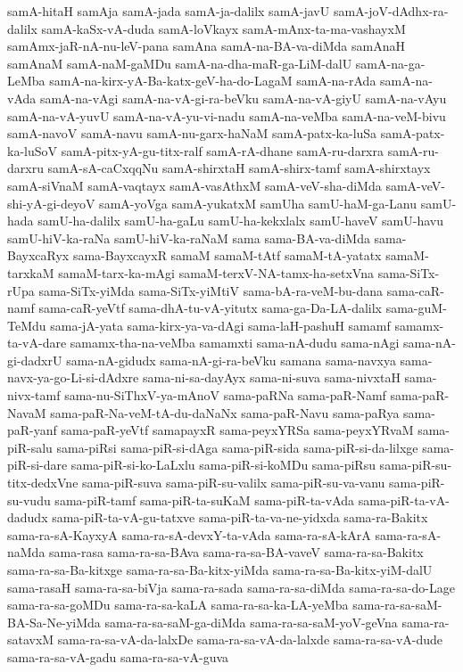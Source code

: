 {samA-hitaH
samAja
samA-jada
samA-ja-dalilx
samA-javU
samA-joV-dAdhx-ra-dalilx
samA-kaSx-vA-duda
samA-loVkayx
samA-mAnx-ta-ma-vashayxM
samAmx-jaR-nA-nu-leV-pana
samAna
samA-na-BA-va-diMda
samAnaH
samAnaM
samA-naM-gaMDu
samA-na-dha-maR-ga-LiM-dalU
samA-na-ga-LeMba
samA-na-kirx-yA-Ba-katx-geV-ha-do-LagaM
samA-na-rAda
samA-na-vAda
samA-na-vAgi
samA-na-vA-gi-ra-beVku
samA-na-vA-giyU
samA-na-vAyu
samA-na-vA-yuvU
samA-na-vA-yu-vi-nadu
samA-na-veMba
samA-na-veM-bivu
samA-navoV
samA-navu
samA-nu-garx-haNaM
samA-patx-ka-luSa
samA-patx-ka-luSoV
samA-pitx-yA-gu-titx-ralf
samA-rA-dhane
samA-ru-darxra
samA-ru-darxru
samA-sA-caCxqqNu
samA-shirxtaH
samA-shirx-tamf
samA-shirxtayx
samA-siVnaM
samA-vaqtayx
samA-vasAthxM
samA-veV-sha-diMda
samA-veV-shi-yA-gi-deyoV
samA-yoVga
samA-yukatxM
samUha
samU-haM-ga-Lanu
samU-hada
samU-ha-dalilx
samU-ha-gaLu
samU-ha-kekxlalx
samU-haveV
samU-havu
samU-hiV-ka-raNa
samU-hiV-ka-raNaM
sama
sama-BA-va-diMda
sama-BayxcaRyx
sama-BayxcayxR
samaM
samaM-tAtf
samaM-tA-yatatx
samaM-tarxkaM
samaM-tarx-ka-mAgi
samaM-terxV-NA-tamx-ha-setxVna
sama-SiTx-rUpa
sama-SiTx-yiMda
sama-SiTx-yiMtiV
sama-bA-ra-veM-bu-dana
sama-caR-namf
sama-caR-yeVtf
sama-dhA-tu-vA-yitutx
sama-ga-Da-LA-dalilx
sama-guM-TeMdu
sama-jA-yata
sama-kirx-ya-va-dAgi
sama-laH-pashuH
samamf
samamx-ta-vA-dare
samamx-tha-na-veMba
samamxti
sama-nA-dudu
sama-nAgi
sama-nA-gi-dadxrU
sama-nA-gidudx
sama-nA-gi-ra-beVku
samana
sama-navxya
sama-navx-ya-go-Li-si-dAdxre
sama-ni-sa-dayAyx
sama-ni-suva
sama-nivxtaH
sama-nivx-tamf
sama-nu-SiThxV-ya-mAnoV
sama-paRNa
sama-paR-Namf
sama-paR-NavaM
sama-paR-Na-veM-tA-du-daNaNx
sama-paR-Navu
sama-paRya
sama-paR-yanf
sama-paR-yeVtf
samapayxR
sama-peyxYRSa
sama-peyxYRvaM
sama-piR-salu
sama-piRsi
sama-piR-si-dAga
sama-piR-sida
sama-piR-si-da-lilxge
sama-piR-si-dare
sama-piR-si-ko-LaLxlu
sama-piR-si-koMDu
sama-piRsu
sama-piR-su-titx-dedxVne
sama-piR-suva
sama-piR-su-valilx
sama-piR-su-va-vanu
sama-piR-su-vudu
sama-piR-tamf
sama-piR-ta-suKaM
sama-piR-ta-vAda
sama-piR-ta-vA-dadudx
sama-piR-ta-vA-gu-tatxve
sama-piR-ta-va-ne-yidxda
sama-ra-Bakitx
sama-ra-sA-KayxyA
sama-ra-sA-devxY-ta-vAda
sama-ra-sA-kArA
sama-ra-sA-naMda
sama-rasa
sama-ra-sa-BAva
sama-ra-sa-BA-vaveV
sama-ra-sa-Bakitx
sama-ra-sa-Ba-kitxge
sama-ra-sa-Ba-kitx-yiMda
sama-ra-sa-Ba-kitx-yiM-dalU
sama-rasaH
sama-ra-sa-biVja
sama-ra-sada
sama-ra-sa-diMda
sama-ra-sa-do-Lage
sama-ra-sa-goMDu
sama-ra-sa-kaLA
sama-ra-sa-ka-LA-yeMba
sama-ra-sa-saM-BA-Sa-Ne-yiMda
sama-ra-sa-saM-ga-diMda
sama-ra-sa-saM-yoV-geVna
sama-ra-satavxM
sama-ra-sa-vA-da-lalxDe
sama-ra-sa-vA-da-lalxde
sama-ra-sa-vA-dude
sama-ra-sa-vA-gadu
sama-ra-sa-vA-guva
}
